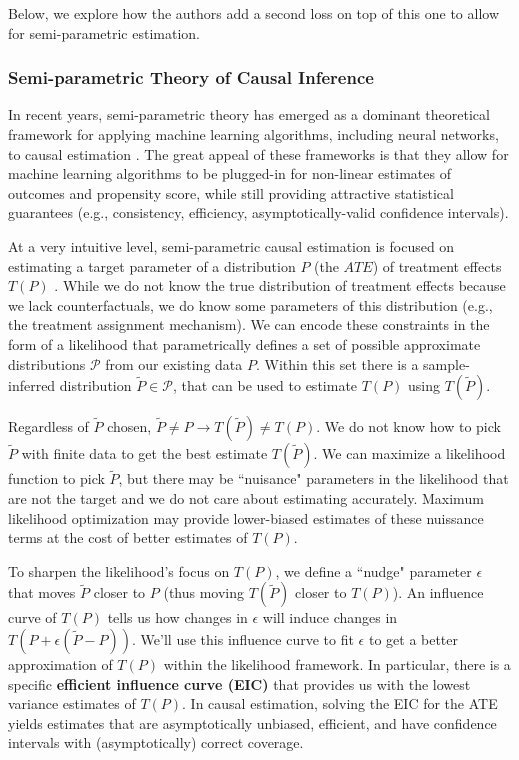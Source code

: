 Below, we explore how the authors add a second loss on top of this one to allow for semi-parametric estimation. 

\subsubsection{Semi-parametric Theory of Causal Inference}

In recent years, semi-parametric theory has emerged as a dominant theoretical framework for applying machine learning algorithms, including neural networks, to causal estimation \citep{chernozhukov2016double,chernozhukov2021automatic,chernozhukov2022riesznet,farrell2021deep,kennedy2016semiparametric,nie2021quasi,van2011targeted,wager2018}. The great appeal of these frameworks is that they allow for machine learning algorithms to be plugged-in for non-linear estimates of outcomes and propensity score, while still providing attractive statistical guarantees (e.g., consistency, efficiency, asymptotically-valid confidence intervals).

At a very intuitive level, semi-parametric causal estimation is focused on estimating a target parameter of a distribution $P$ (the $ATE$) of treatment effects $T(P)$ \citep{fisher2021visually}. While we do not know the true distribution of treatment effects because we lack counterfactuals, we do know some parameters of this distribution (e.g., the treatment assignment mechanism). We can encode these constraints in the form of a likelihood that parametrically defines a set of possible approximate distributions  $\mathcal{P}$ from our existing data $P$. Within this set there is a sample-inferred distribution $\tilde{P}\in\mathcal{P}$, that can be used to estimate $T(P)$ using $T(\tilde{P})$.

Regardless of $\tilde{P}$ chosen, $\tilde{P}\neq P \rightarrow T(\tilde{P})\neq T(P)$. We do not know how to pick $\tilde{P}$ with finite data to get the best estimate $T(\tilde{P})$. We can maximize a likelihood function to pick $\tilde{P}$, but there may be ``nuisance" parameters in the likelihood that are not the target and we do not care about estimating accurately. Maximum likelihood optimization may provide lower-biased estimates of these nuissance terms at the cost of better estimates of $T(P)$. 

To sharpen the likelihood's focus on $T(P)$, we define a ``nudge" parameter $\epsilon$ that moves $\tilde{P}$ closer to $P$ (thus moving $T(\tilde{P})$ closer to $T(P)$). An influence curve of $T(P)$ tells us how changes in $\epsilon$ will induce changes in $T(P+\epsilon(\tilde{P}-P))$. We'll use this influence curve to fit $\epsilon$ to get a better approximation of $T(P)$ within the likelihood framework. In particular, there is a specific \textbf{efficient influence curve (EIC)} that provides us with the lowest variance estimates of $T(P)$. In causal estimation, solving the EIC for the ATE yields estimates that are asymptotically unbiased, efficient, and have confidence intervals with (asymptotically) correct coverage.

